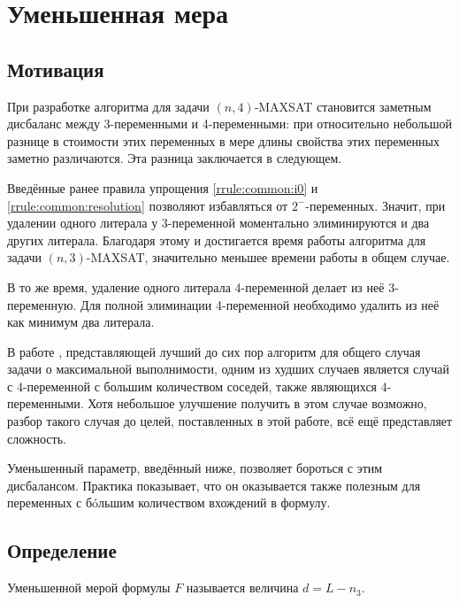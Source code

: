 
\section{Уменьшенная мера}
\label{sec:measure}

\subsection{Мотивация}
\label{subsec:measure:motivation}

\firstpar{}При разработке алгоритма для задачи $(n,4)$-MAXSAT становится заметным дисбаланс между 3-переменными и 4-переменными: при относительно небольшой разнице в стоимости этих переменных в мере длины свойства этих переменных заметно различаются. Эта разница заключается в следующем.

Введённые ранее правила упрощения \ref{rrule:common:i0} и \ref{rrule:common:resolution} позволяют избавляться от $2^-$-переменных. Значит, при удалении одного литерала у 3-переменной моментально элиминируются и два других литерала. Благодаря этому и достигается время работы алгоритма для задачи $(n,3)$-MAXSAT, значительно меньшее времени работы в общем случае.

В то же время, удаление одного литерала 4-переменной делает из неё 3-переменную. Для полной элиминации 4-переменной необходимо удалить из неё как минимум два литерала.

В работе \cite{bansal99}, представляющей лучший до сих пор алгоритм для общего случая задачи о максимальной выполнимости, одним из худших случаев является случай с 4-переменной с большим количеством соседей, также являющихся 4-переменными. Хотя небольшое улучшение получить в этом случае возможно, разбор такого случая до целей, поставленных в этой работе, всё ещё представляет сложность.

Уменьшенный параметр, введённый ниже, позволяет бороться с этим дисбалансом. Практика показывает, что он оказывается также полезным для переменных с бóльшим количеством вхождений в формулу.

\subsection{Определение}
\label{subsec:measure:definition}

\begin{definition}
 Уменьшенной мерой формулы $F$ называется величина $d = L - n_3$.
\end{definition}

